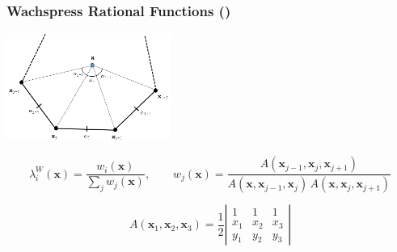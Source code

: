 \documentclass[compress,10pt]{beamer}
\renewcommand{\vec}[1]{\mathbf{#1}}
\begin{document}
\begin{frame}[t,label=main_wach]\frametitle{Wachspress Rational Functions (\hyperlink{poly_limits<1>}{})}
\centering
\includegraphics[width=0.40\textwidth]{images/ref_polygon.png}
\vspace{0.3cm}
\begin{block}{}
\begin{equation*}
\lambda_i^W (\vec{x}) = \frac{w_i (\vec{x}) }{ \sum_{j} w_j (\vec{x})}, \qquad w_j (\vec{x}) = \frac{A(\vec{x}_{j-1}, \vec{x}_{j}, \vec{x}_{j+1})}{A(\vec{x}, \vec{x}_{j-1}, \vec{x}_{j}) \, A(\vec{x}, \vec{x}_{j}, \vec{x}_{j+1})}
\end{equation*}
\end{block}
\begin{block}{}
\begin{equation*}
A(\vec{x}_1, \vec{x}_{2}, \vec{x}_{3}) = \frac{1}{2} \left|
\begin{array}{ccc}
1 & 1 & 1 \\
x_1 & x_2 & x_3 \\
y_1 & y_2 & y_3
\end{array} \right|
\end{equation*}
\end{block}
\end{frame}
\end{document}
